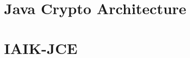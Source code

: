 \section{Java Crypto Architecture} \label{section:pre:jca}


\section{IAIK-JCE} \label{section:pre:jce}




